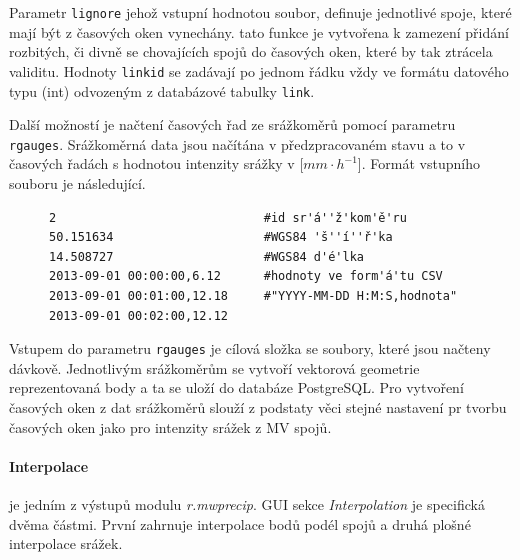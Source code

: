 \documentclass[a4paper,12pt,oneside]{report}
\begin{document}
Parametr \texttt{lignore} jehož vstupní hodnotou soubor, definuje jednotlivé spoje, které mají být z časových oken vynechány. tato funkce je vytvořena k zamezení přidání rozbitých, či divně se chovajících spojů do časových oken, které by tak ztrácela validitu. Hodnoty \texttt{linkid} se zadávají po jednom řádku vždy ve formátu datového typu (int) odvozeným z databázové tabulky \texttt{link}.

Další možností je načtení časových řad ze srážkoměrů pomocí parametru \texttt{rgauges}. Srážkoměrná data jsou načítána v předzpracovaném stavu a to v časových řadách s hodnotou intenzity srážky v [$mm \cdot h^{-1}$]. Formát vstupního souboru je následující.


\begin{figure}[h!]
\begin{footnotesize}
\lstset{extendedchars=false,
escapeinside=''}
\begin{lstlisting}[style=mybash]
2                             #id sr'á''ž'kom'ě'ru			
50.151634                     #WGS84 'š''í''ř'ka				
14.508727                     #WGS84 d'é'lka	
2013-09-01 00:00:00,6.12      #hodnoty ve form'á'tu CSV 
2013-09-01 00:01:00,12.18     #"YYYY-MM-DD H:M:S,hodnota"		
2013-09-01 00:02:00,12.12

\end{lstlisting}
\end{footnotesize}
\end{figure}


Vstupem do parametru \texttt{rgauges} je cílová složka se soubory, které jsou načteny dávkově. Jednotlivým srážkoměrům se vytvoří vektorová geometrie reprezentovaná body a ta se uloží do databáze PostgreSQL. Pro vytvoření časových oken z dat srážkoměrů slouží z podstaty věci stejné nastavení pr tvorbu časových oken jako pro intenzity srážek z MV spojů.


\paragraph*{Interpolace} je jedním z výstupů modulu \textit{r.mwprecip}. GUI sekce \textit{Interpolation} je specifická dvěma částmi. První zahrnuje interpolace bodů podél spojů a druhá plošné interpolace srážek.
\end{document}
